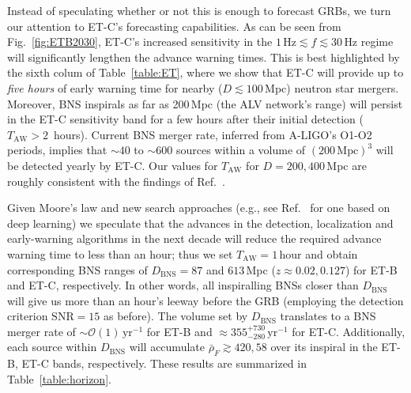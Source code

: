 \documentclass[prd,amsmath,amssymb,aps,floats,amsfonts,notitlepage,superscriptaddress,eqsecnum,nofootinbib,10pt]{revtex4-1}
\begin{document}
Instead of speculating whether or not this is enough to forecast GRBs, we turn our attention to ET-C's forecasting capabilities.
As can be seen from Fig.~\ref{fig:ETB2030}, ET-C's increased sensitivity in the $1\,\text{Hz}\lesssim f\lesssim 30\,$Hz regime will significantly lengthen the advance warning times.
This is best highlighted by the sixth colum of Table~\ref{table:ET}, 
where we show that ET-C will provide up to \emph{five hours} of early warning time for nearby ($D\lesssim 100\,$Mpc) neutron star mergers.
Moreover, BNS inspirals as far as 200\,Mpc (the ALV network's range) will persist in the ET-C sensitivity band for a few hours after their initial detection ($T_\text{AW} > 2\,$ hours).
Current BNS merger rate, inferred from A-LIGO's O1-O2 periods, implies that $\sim 40$ to $\sim600$ sources within a volume of $(200\,\text{Mpc})^3$ will be detected yearly by ET-C. 
Our values for $T_\text{AW}$ for $D=200, 400\,$Mpc are roughly consistent
with the findings of Ref.~\cite{Chan:2018csa}.

Given Moore's law and new search approaches (e.g., see Ref.~\cite{Gabbard:2017lja} for one based on deep learning) 
we speculate that the advances in the detection, localization and early-warning algorithms in the next decade will reduce the required advance
warning time to less than an hour; thus we set $T_\text{AW} = 1\,\text{hour}$ and obtain corresponding BNS ranges of $D_\text{BNS}=87$ and $613\,$Mpc ($z\approx 0.02,0.127$) for ET-B and ET-C, respectively.
In other words, all inspiralling BNSs closer than $D_\text{BNS}$ will give us more than an hour's leeway before the GRB (employing the detection criterion $\text{SNR} =15$ as before).
The volume set by $D_\text{BNS}$ translates to a BNS merger rate of $\sim\mathcal{O}(1)\,\text{yr}^{-1}$ for ET-B and
$\approx 355^{+730}_{-280}\,\text{yr}^{-1}$ for ET-C. Additionally, each source within $D_\text{BNS}$ will accumulate $\bar\rho_F \gtrsim 420, 58$ over its inspiral
in the ET-B, ET-C bands, respectively. These results are summarized in Table~\ref{table:horizon}.
\end{document}
